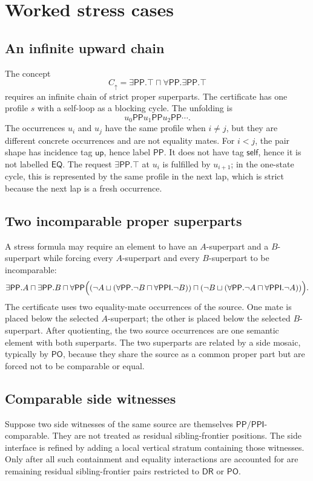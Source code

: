 \documentclass[11pt]{article}
\newcommand{\EQ}{\mathsf{EQ}}
\newcommand{\DR}{\mathsf{DR}}
\newcommand{\PO}{\mathsf{PO}}
\newcommand{\PP}{\mathsf{PP}}
\newcommand{\PPI}{\mathsf{PPI}}
\newcommand{\up}{\mathsf{up}}
\newcommand{\self}{\mathsf{self}}
\begin{document}
\section{Worked stress cases}

\subsection{An infinite upward chain}

The concept
\[
  C_\uparrow=\exists\PP.\top\sqcap\forall\PP.\exists\PP.\top
\]
requires an infinite chain of strict proper superparts.  The certificate has one profile $s$ with a self-loop as a blocking cycle.  The unfolding is
\[
  u_0\PP u_1\PP u_2\PP\cdots.
\]
The occurrences $u_i$ and $u_j$ have the same profile when $i\ne j$, but they are different concrete occurrences and are not equality mates.  For $i<j$, the pair shape has incidence tag $\up$, hence label $\PP$.  It does not have tag $\self$, hence it is not labelled $\EQ$.  The request $\exists\PP.\top$ at $u_i$ is fulfilled by $u_{i+1}$; in the one-state cycle, this is represented by the same profile in the next lap, which is strict because the next lap is a fresh occurrence.

\subsection{Two incomparable proper superparts}

A stress formula may require an element to have an $A$-superpart and a $B$-superpart while forcing every $A$-superpart and every $B$-superpart to be incomparable:
\[
\exists\PP.A\sqcap\exists\PP.B\sqcap
\forall\PP\Bigl((\neg A\sqcup(\forall\PP.\neg B\sqcap\forall\PPI.\neg B))
\sqcap
(\neg B\sqcup(\forall\PP.\neg A\sqcap\forall\PPI.\neg A))\Bigr).
\]
The certificate uses two equality-mate occurrences of the source.  One mate is placed below the selected $A$-superpart; the other is placed below the selected $B$-superpart.  After quotienting, the two source occurrences are one semantic element with both superparts.  The two superparts are related by a side mosaic, typically by $\PO$, because they share the source as a common proper part but are forced not to be comparable or equal.

\subsection{Comparable side witnesses}

Suppose two side witnesses of the same source are themselves $\PP/\PPI$-comparable.  They are not treated as residual sibling-frontier positions.  The side interface is refined by adding a local vertical stratum containing those witnesses.  Only after all such containment and equality interactions are accounted for are remaining residual sibling-frontier pairs restricted to $\DR$ or $\PO$.
\end{document}
